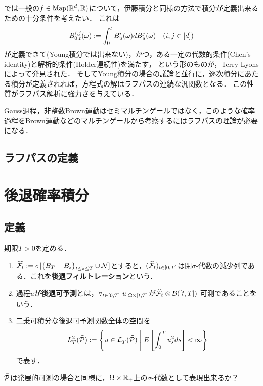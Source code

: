 \documentclass[uplatex,dvipdfmx]{jsreport}
\begin{document}
\begin{history}
    では一般の$f\in\mathrm{Map}(\mathbb{R}^d,\mathbb{R})$について，伊藤積分と同様の方法で積分が定義出来るための十分条件を考えたい．
    これは
    \[B^{i,j}_{0,t}(\omega):=\int^t_0B^i_u(\omega)dB^j_u(\omega)\quad(i,j\in[d])\]
    が定義できて(Young積分では出来ない)，かつ，ある一定の代数的条件(Chen's identity)と解析的条件(Holder連続性)を満たす，
    という形のものが，Terry Lyonsによって発見された．
    そしてYoung積分の場合の議論と並行に，逐次積分にあたる積分が定義されれば，方程式の解はラフパスの連続な汎関数となる．
    この性質がラフパス解析に強力さを与えている．
\end{history}

\begin{context}
    Gauss過程，非整数Brown運動はセミマルチンゲールではなく，このような確率過程をBrown運動などのマルチンゲールから考察するにはラフパスの理論が必要になる．
\end{context}

\subsection{ラフパスの定義}

\section{後退確率積分}

\subsection{定義}

\begin{definition}
    期限$T>0$を定める．
    \begin{enumerate}
        \item $\widehat{\mathcal{F}_t}:=\sigma[\left\{B_T-B_s\right\}_{t\le s\le T}\cup\mathcal{N}]$とすると，$(\widehat{\mathcal{F}}_t)_{t\in[0,T]}$は閉$\sigma$-代数の減少列である．これを\textbf{後退フィルトレーション}という．
        \item 過程$u$が\textbf{後退可予測}とは，$\forall_{t\in[0,T]}\;u|_{\Omega\times[t,T]}$が$\widehat{\mathcal{F}}_t\otimes\mathcal{B}([t,T])$-可測であることをいう．
        \item 二乗可積分な後退可予測関数全体の空間を
        \[L^2_T(\widehat{\mathcal{P}}):=\left\{u\in\mathcal{L}_T(\widehat{\mathcal{P}})\;\middle|\;E\left[\int^T_0u_s^2ds\right]<\infty\right\}\]
        で表す．
    \end{enumerate}
\end{definition}
\begin{remarks}
    $\widehat{\mathcal{P}}$は発展的可測の場合と同様に，$\Omega\times\mathbb{R}_+$上の$\sigma$-代数として表現出来るか？
\end{remarks}
\end{document}
